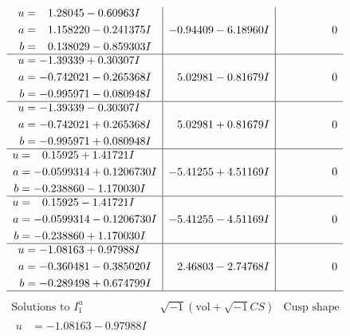 \documentclass[1p]{elsarticle_modified}
\theoremstyle{definition}
\newcommand{\I}{\sqrt{-1}}
\begin{document}
$$\begin{array}{c|c|c}
\begin{aligned}
u &= \phantom{-}1.28045 - 0.60963 I \\
a &= \phantom{-}1.158220 - 0.241375 I \\
b &= \phantom{-}0.138029 - 0.859303 I\end{aligned}
 & -0.94409 - 6.18960 I & \phantom{-0.000000 } 0 \\ \hline\begin{aligned}
u &= -1.39339 + 0.30307 I \\
a &= -0.742021 - 0.265368 I \\
b &= -0.995971 - 0.080948 I\end{aligned}
 & \phantom{-}5.02981 - 0.81679 I & \phantom{-0.000000 } 0 \\ \hline\begin{aligned}
u &= -1.39339 - 0.30307 I \\
a &= -0.742021 + 0.265368 I \\
b &= -0.995971 + 0.080948 I\end{aligned}
 & \phantom{-}5.02981 + 0.81679 I & \phantom{-0.000000 } 0 \\ \hline\begin{aligned}
u &= \phantom{-}0.15925 + 1.41721 I \\
a &= -0.0599314 + 0.1206730 I \\
b &= -0.238860 - 1.170030 I\end{aligned}
 & -5.41255 + 4.51169 I & \phantom{-0.000000 } 0 \\ \hline\begin{aligned}
u &= \phantom{-}0.15925 - 1.41721 I \\
a &= -0.0599314 - 0.1206730 I \\
b &= -0.238860 + 1.170030 I\end{aligned}
 & -5.41255 - 4.51169 I & \phantom{-0.000000 } 0 \\ \hline\begin{aligned}
u &= -1.08163 + 0.97988 I \\
a &= -0.360481 - 0.385020 I \\
b &= -0.289498 + 0.674799 I\end{aligned}
 & \phantom{-}2.46803 - 2.74768 I & \phantom{-0.000000 } 0\\
 \hline 
 \end{array}$$\newpage$$\begin{array}{c|c|c}  
\text{Solutions to }I^u_{1}& \I (\text{vol} + \sqrt{-1}CS) & \text{Cusp shape}\\
 \hline 
\begin{aligned}
u &= -1.08163 - 0.97988 I \\

\end{aligned}
\end{array}$$
\end{document}
